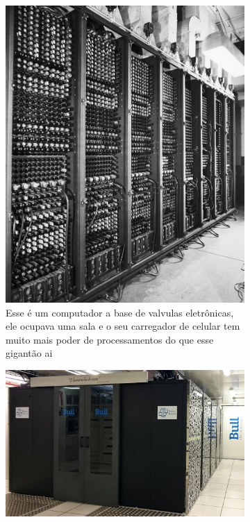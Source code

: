 \documentclass[12pt]{extarticle}
\newcommand{\<}{\langle}
\renewcommand{\>}{\rangle}
\theoremstyle{definition}
\begin{document}
\begin{figure}[H]
    \centering
    \begin{subfigure}[b]{0.45\textwidth}
         \centering
         \includegraphics[width=\textwidth]{computador_valvula.jpg}
         \caption{Esse é um computador a base de valvulas eletrônicas, ele ocupava uma sala e o seu carregador de celular tem muito mais poder de processamentos do que esse gigantão ai}
         \label{fig:valvula}
     \end{subfigure}
     \hfill
     \begin{subfigure}[b]{0.45\textwidth}
         \centering
         \includegraphics[width=\textwidth]{lncc.jpg}

\end{subfigure}
\end{figure}
\end{document}
